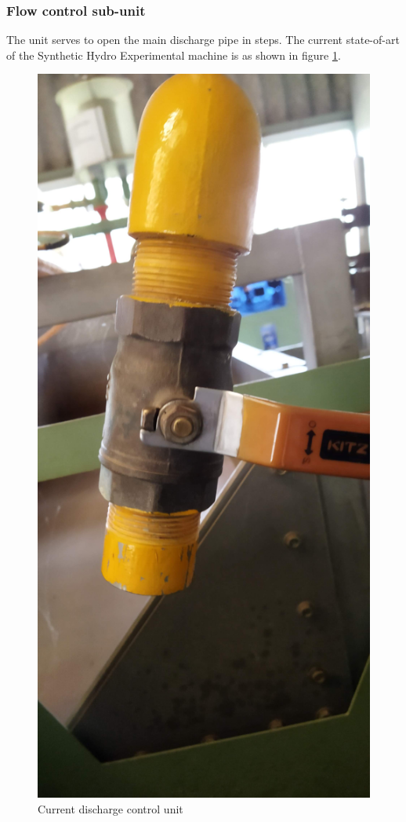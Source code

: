 \subsubsection{Flow control  sub-unit}
The unit serves to open the main discharge pipe in steps. The current state-of-art of the Synthetic Hydro Experimental machine is as shown in figure \ref{fig:current_discharge_control_unit}. 
\begin{figure}[H]
    \centering
    \includegraphics[width=\textwidth,height=0.3\textheight,keepaspectratio]{Figures/ballValve.jpg}
    \caption{Current discharge control unit}
    \label{fig:current_discharge_control_unit}
\end{figure}
